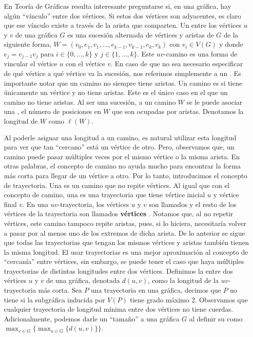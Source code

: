 En Teor\'ia de Gr\'aficas resulta interesante preguntarse si, en una gr\'afica,
hay alg\'un ``v\'inculo'' entre dos v\'ertices. Si estos dos v\'ertices son
adyacentes, es claro que ese v\'inculo existe a trav\'es de la arista que
comparten. Un  entre los v\'ertices $u$ y $v$ de una
gr\'afica $G$ es una sucesi\'on alternada de v\'ertices y aristas de $G$ de la
siguiente forma, $W=(v_0, e_1,v_1, \dots, e_{k-1},v_{k-1}, e_k,v_k)$ con $v_i
\in V(G)$ y donde $e_j = v_{j-1}v_j$ para $i \in \{0, \dots, k\}$ y $j \in \{ 1,
\dots, k\}$. Este $uv$-camino es una forma de vincular el v\'ertice $u$ con el
v\'ertice $v$. En caso de que no sea necesario especificar de qu\'e v\'ertice a
qu\'e v\'ertice va la sucesi\'on, nos referimos simplemente a un
. Es importante notar que un camino no siempre tiene aristas. Un
camino es  si tiene \'unicamente un v\'ertice y no
tiene aristas. Este es el \'unico caso en el que un camino no tiene aristas. Al
ser una sucesi\'on, a un camino $W$ se le puede asociar una
, el n\'umero de posiciones en $W$ que son ocupadas
por aristas. Denotamos la longitud de $W$ como $\ell(W)$. 

Al poderle asignar una longitud a un camino, es natural utilizar esta longitud
para ver que tan ``cercano'' est\'a un v\'ertice de otro. Pero, observamos que,
un camino puede pasar m\'ultiples veces por el mismo v\'ertice o la misma
arista. En otras palabras, el concepto de camino no ayuda mucho para encontrar
la forma m\'as corta para llegar de un v\'ertice a otro. Por lo tanto,
introducimos el concepto de trayectoria. Una  es un camino
que no repite v\'ertices. Al igual que con el concepto de camino, una
 es una trayectoria que tiene v\'ertice inicial $u$ y
v\'ertice final $v$. En una $uv$-trayectoria, los v\'ertices $u$ y $v$ son
llamados  y el resto de los v\'ertices de la
trayectoria son llamados \textbf{v\'ertices} .
Notamos que, al no repetir v\'ertices, este camino tampoco repite aristas, pues,
si lo hiciera, necesitar\'ia volver a pasar por al menos uno de los extremos de
dicha arista. De lo anterior se sigue que todas las trayectorias que tengan los
mismos v\'ertices y aristas tambi\'en tienen la misma longitud. El usar
trayectorias es una mejor aproximaci\'on al concepto de ``cercan\'ia'' entre
v\'ertices, sin embargo, se puede tener el caso que haya m\'ultiples
trayectorias de distintas longitudes entre dos v\'ertices. Definimos la
 entre dos v\'ertices $u$ y $v$ de una gr\'afica, denotada
$d(u,v)$, como la longitud de la $uv$-trayectoria m\'as corta. Sea $P$ una
trayectoria en una gr\'afica, decimos que $P$ no tiene  si la
subgr\'afica inducida por $V(P)$ tiene grado m\'aximo 2. Observamos que
cualquier trayectoria de longitud m\'inima entre dos v\'ertices no tiene
cuerdas. Adicionalmente, podemos darle un ``tama\~{n}o'' a una gr\'afica $G$ al
definir su  como $\max_{v\in G}\{\max_{u\in G}\{d(u,v)\}\}$. 

